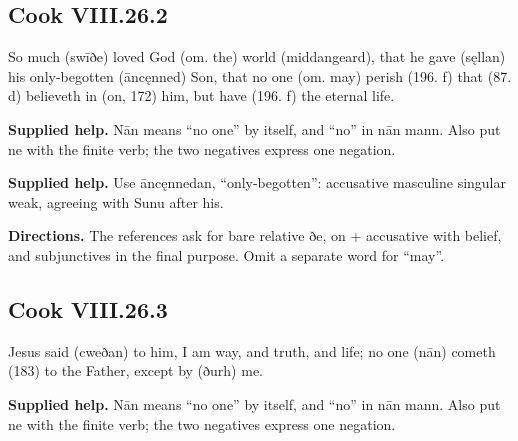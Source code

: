 \par\begin{minipage}{\linewidth}\raggedright
\subsection*{Cook VIII.26.2}

So much (swīðe) loved God (om. the) world (middangeard), that he gave (sęllan) his only-begotten (āncęnned) Son, that no one (om. may) perish (196. f) that (87. d) believeth in (on, 172) him, but have (196. f) the eternal life.

\end{minipage}\par\addvspace{4pt}

\textbf{Supplied help.} Nān means “no one” by itself, and “no” in nān mann. Also put ne with the finite verb; the two negatives express one negation.

\textbf{Supplied help.} Use āncęnnedan, “only-begotten”: accusative masculine singular weak, agreeing with Sunu after his.

\textbf{Directions.} The references ask for bare relative ðe, on + accusative with belief, and subjunctives in the final purpose. Omit a separate word for “may”.

\par\begin{minipage}{\linewidth}\raggedright
\subsection*{Cook VIII.26.3}

Jesus said (cweðan) to him, I am way, and truth, and life; no one (nān) cometh (183) to the Father, except by (ðurh) me.

\textbf{Supplied help.} Nān means “no one” by itself, and “no” in nān mann. Also put ne with the finite verb; the two negatives express one negation.

\end{minipage}\par\addvspace{4pt}

